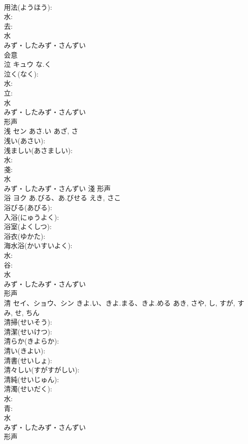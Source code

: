 \documentclass[8pt]{extreport}
\begin{document}
\begin{CJK}{UTF8}{min}
\\	用法(ようほう): 
\\	水: 
\\	去: 
\\	水	
\\	みず・したみず・さんずい	
\\	会意 
\\	泣	キュウ	な.く		
\\	泣く(なく): 
\\	水: 
\\	立: 
\\	水	
\\	みず・したみず・さんずい	
\\	形声 
\\	浅	セン	あさ.い	あざ, さ	
\\	浅い(あさい): 
\\	浅ましい(あさましい): 
\\	水: 
\\	戔: 
\\	水	
\\	みず・したみず・さんずい	淺	形声 
\\	浴	ヨク	あ.びる、あ.びせる	えき, さこ	
\\	浴びる(あびる): 
\\	入浴(にゅうよく): 
\\	浴室(よくしつ): 
\\	浴衣(ゆかた): 
\\	海水浴(かいすいよく): 
\\	水: 
\\	谷: 
\\	水	
\\	みず・したみず・さんずい	
\\	形声 
\\	清	セイ、ショウ、シン	きよ.い、きよ.まる、きよ.める	あき, さや, し, すが, すみ, せ, ちん	
\\	清掃(せいそう): 
\\	清潔(せいけつ): 
\\	清らか(きよらか): 
\\	清い(きよい): 
\\	清書(せいしょ): 
\\	清々しい(すがすがしい): 
\\	清純(せいじゅん): 
\\	清濁(せいだく): 
\\	水: 
\\	青: 
\\	水	
\\	みず・したみず・さんずい	
\\	形声 

\end{CJK}
\end{document}
